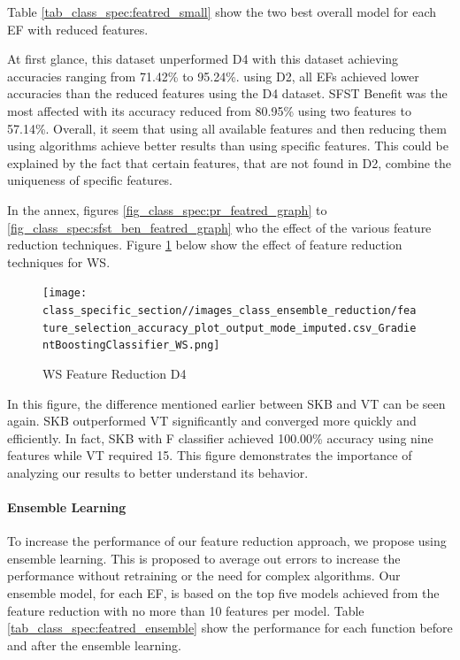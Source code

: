 \documentclass[12pt,letterpaper]{article}
\begin{document}
Table \ref{tab_class_spec:featred_small} show the two best overall model for each \ac{EF} with reduced features.

At first glance, this dataset unperformed D4 with this dataset achieving accuracies ranging from 71.42\% to 95.24\%. 
using D2, all \ac{EF}s achieved lower accuracies than the reduced features using the D4 dataset.
\ac{SFST} Benefit was the most affected with its accuracy reduced from 80.95\% using two features to 57.14\%.
Overall, it seem that using all available features and then reducing them using algorithms achieve better results than using specific features.
This could be explained by the fact that certain features, that are not found in D2, combine the uniqueness of specific features.


In the annex, figures \ref{fig_class_spec:pr_featred_graph} to \ref{fig_class_spec:sfst_ben_featred_graph} who the effect of the various feature reduction techniques.
Figure \ref{class_spec_tab:featred_pr} below show the effect of feature reduction techniques for \ac{WS}.

\begin{figure}
    \centering
    \texttt{[image: class\_specific\_section//images\_class\_ensemble\_reduction/feature\_selection\_accuracy\_plot\_output\_mode\_imputed.csv\_GradientBoostingClassifier\_WS.png]}
    \caption{WS Feature Reduction D4}
    \label{class_spec_tab:featred_pr}
\end{figure}


In this figure, the difference mentioned earlier between \ac{SKB} and \ac{VT} can be seen again.
\ac{SKB} outperformed \ac{VT} significantly and converged more quickly and efficiently.
In fact, \ac{SKB} with F classifier achieved 100.00\% accuracy using nine features while \ac{VT} required 15.
This figure demonstrates the importance of analyzing our results to better understand its behavior.



\paragraph{Ensemble Learning}
To increase the performance of our feature reduction approach, we propose using ensemble learning.
This is proposed to average out errors to increase the performance without retraining or the need for complex algorithms.
Our ensemble model, for each \ac{EF}, is based on the top five models achieved from the feature reduction with no more than 10 features per model.
Table \ref{tab_class_spec:featred_ensemble} show the performance for each function before and after the ensemble learning.
\end{document}
